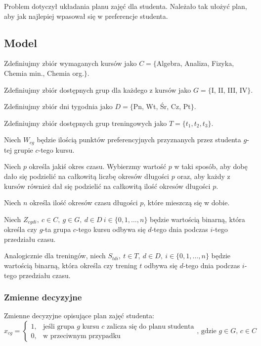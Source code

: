 \documentclass{article}
\begin{document}
        Problem dotyczył układania planu zajęć dla studenta. Należało tak ułożyć plan, aby jak najlepiej wpasował się w preferencje studenta.
    
    \subsection{Model}

        Zdefiniujmy zbiór wymaganych kursów jako $C = \{$Algebra, Analiza, Fizyka, Chemia min., Chemia org.$\}$.
        
        Zdefiniujmy zbiór dostępnych grup dla każdego z kursów jako $G = \{$I, II, III, IV$\}$.
        
        Zdefiniujmy zbiór dni tygodnia jako $D = \{$Pn, Wt, Śr, Cz, Pt$\}$.
        
        Zdefiniujmy zbiór dostępnych grup treningowych jako $T = \{t_1, t_2, t_3\}$.

        Niech $W_{cg}$ będzie ilością punktów preferencyjnych przyznanych przez studenta 
        $g$-tej grupie $c$-tego kursu.

        Niech $p$ określa jakiś okres czasu. Wybierzmy wartość $p$ w taki sposób, 
        aby dobę dało się podzielić na całkowitą liczbę okresów długości $p$ oraz, aby 
        każdy z kursów również dał się podzielić na całkowitą ilość okresów długości $p$.

        Niech $n$ określa ilość okresów czasu długości $p$, które mieszczą się w dobie.

        Niech $Z_{cgdi}, \ c \in C, \ g \in G, \ d \in D \ i \in \{0,1,\dots,n\}$ będzie wartością binarną, która określa czy 
        $g$-ta grupa $c$-tego kursu odbywa się $d$-tego dnia podczas $i$-tego przedziału czasu.

        Analogicznie dla treningów, niech $S_{tdi}, \ t \in T, \ d \in D, \ i \in \{0,1,\dots,n\}$ będzie 
        wartością binarną, która określa czy trening $t$ odbywa się $d$-tego dnia podczas 
        $i$-tego przedziału czasu.

    \subsubsection{Zmienne decyzyjne}

        Zmienne decyzyjne opisujące plan zajęć studenta:
        \begin{equation*}
            x_{cg} =
            \begin{cases}
                1, & \text{jeśli grupa $g$ kursu $c$ zalicza się do planu studenta} \\
                0, & \text{w przeciwnym przypadku}
            \end{cases}
            \text{, gdzie $g \in G$, $c \in C$}
        \end{equation*}
        
\end{document}
